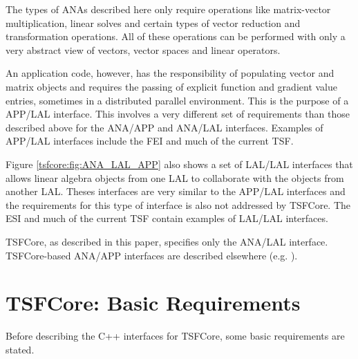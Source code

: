 The types of ANAs described here only require operations like
matrix-vector multiplication, linear solves and certain types of
vector reduction and transformation operations.  All of these
operations can be performed with only a very abstract view of vectors,
vector spaces and linear operators.

An application code, however, has the responsibility of populating
vector and matrix objects and requires the passing of explicit
function and gradient value entries, sometimes in a distributed
parallel environment.  This is the purpose of a APP/LAL interface.
This involves a very different set of requirements than those
described above for the ANA/APP and ANA/LAL interfaces.  Examples of
APP/LAL interfaces include the FEI {}\cite{ref:fei} and much of the
current TSF.

Figure {}\ref{tsfcore:fig:ANA_LAL_APP} also shows a set of LAL/LAL
interfaces that allows linear algebra objects from one LAL to
collaborate with the objects from another LAL.  Theses interfaces are
very similar to the APP/LAL interfaces and the requirements for this
type of interface is also not addressed by TSFCore.  The ESI
{}\cite{ref:esi_2001} and much of the current TSF contain examples of
LAL/LAL interfaces.

TSFCore, as described in this paper, specifies only the
ANA/LAL interface.  TSFCore-based ANA/APP interfaces are
described elsewhere (e.g. {}\cite{ref:TSFCore::Nonlin}).

%
\section{TSFCore: Basic Requirements}
\label{tsfcore:sec:TSFCore_requirements}
%

Before describing the C++ interfaces for TSFCore, some basic
requirements are stated.

